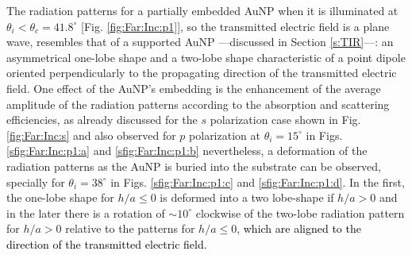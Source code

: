 The radiation patterns for a partially embedded AuNP when it is illuminated at $\theta_i < \theta_c = 41.8^\circ$ [Fig. \ref{fig:Far:Inc:p1}], so the transmitted electric field is a plane wave,  resembles  that of a supported AuNP ---discussed in Section \ref{s:TIR}---: an asymmetrical one-lobe shape and a two-lobe shape characteristic of a point dipole oriented perpendicularly to the propagating direction of the transmitted electric field. One effect of the AuNP's embedding is the enhancement of the average amplitude of the radiation patterns according to the absorption and scattering efficiencies, as already discussed for the $s$ polarization case shown in Fig. \ref{fig:Far:Inc:s} and also observed  for $p$ polarization at $\theta_i = 15^\circ$ in Figs. \ref{sfig:Far:Inc:p1:a} and \ref{sfig:Far:Inc:p1:b} nevertheless, a deformation of the radiation patterns as the AuNP is buried into the substrate can be observed, specially for $\theta_i = 38^\circ$ in Figs. \ref{sfig:Far:Inc:p1:c} and \ref{sfig:Far:Inc:p1:d}. In the first, the one-lobe shape for $h/a\leq 0$ is deformed into a two lobe-shape if $h/a>0$  and in the later there is a rotation of $\sim 10^\circ$ clockwise of the two-lobe radiation pattern for $h/a>0$ relative to the patterns for $h/a\leq0$, \textcolor{black}{which are aligned to the direction of the transmitted electric field.}

